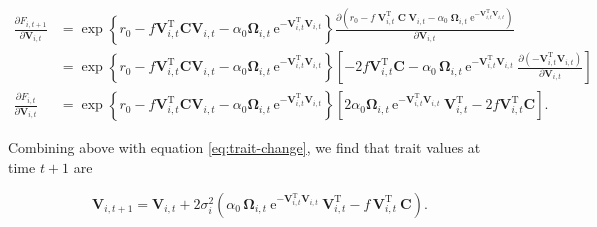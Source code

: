 \begin{equation*}
\begin{split}
    \frac{\partial F_{i,t+1}}{\partial \mathbf{V}_{i,t}} &=
        \exp \left\{
            r_0
            - f \mathbf{V}_{i,t}^{\textrm{T}} \mathbf{C} \mathbf{V}_{i,t}
            - \alpha_0  \mathbf{\Omega}_{i,t} \,
                \textrm{e}^{- \mathbf{V}_{i,t}^{\textrm{T}} \mathbf{V}_{i,t}}
        \right\}
        \frac{\partial \!
            \left(
                r_0
                - f \; \mathbf{V}_{i,t}^{\textrm{T}} \; \mathbf{C} \; \mathbf{V}_{i,t}
                - \alpha_0 \; \mathbf{\Omega}_{i,t} \;
                    \textrm{e}^{- \mathbf{V}_{i,t}^{\textrm{T}} \mathbf{V}_{i,t}}
            \right)
            }{ \partial \mathbf{V}_{i,t} } \\
     &=
        \exp \left\{
            r_0
            - f \mathbf{V}_{i,t}^{\textrm{T}} \mathbf{C} \mathbf{V}_{i,t}
            - \alpha_0  \mathbf{\Omega}_{i,t} \,
                \textrm{e}^{- \mathbf{V}_{i,t}^{\textrm{T}} \mathbf{V}_{i,t}}
        \right\}
        \left[
            - 2 f \mathbf{V}_{i,t}^{\textrm{T}} \mathbf{C}
            - \alpha_0 \, \mathbf{\Omega}_{i,t} \,
                \textrm{e}^{- \mathbf{V}_{i,t}^{\textrm{T}} \mathbf{V}_{i,t} } \:
                \frac{\partial \! \left( - \mathbf{V}_{i,t}^{\textrm{T}} \mathbf{V}_{i,t} \right)
                    }{ \partial \mathbf{V}_{i,t} }
        \right] \\[2ex]
    \frac{ \partial F_{i,t} }{ \partial \mathbf{V}_{i,t} } &=
        \exp \left\{
            r_0
            - f \mathbf{V}_{i,t}^{\textrm{T}} \mathbf{C} \mathbf{V}_{i,t}
            - \alpha_0  \mathbf{\Omega}_{i,t} \,
                \textrm{e}^{- \mathbf{V}_{i,t}^{\textrm{T}} \mathbf{V}_{i,t}}
        \right\}
        \left[
            2 \alpha_0 \mathbf{\Omega}_{i,t} \,
                \textrm{e}^{- \mathbf{V}_{i,t}^{\textrm{T}} \mathbf{V}_{i,t}} \:
                \mathbf{V}_{i,t}^{\textrm{T}}
            - 2 f \mathbf{V}_{i,t}^{\textrm{T}} \mathbf{C}
        \right]
    \textrm{.}
\end{split}
\end{equation*}



Combining above with equation \ref{eq:trait-change}, we find that trait values at
time $t+1$ are

\begin{equation} \label{eq:trait-change-full}
    \mathbf{V}_{i,t+1} = \mathbf{V}_{i,t} + 2 \sigma_i^2
    \left(
        \alpha_0 \, \mathbf{\Omega}_{i,t} \:
            \textrm{e}^{- \mathbf{V}_{i,t}^{\textrm{T}} \mathbf{V}_{i,t}} \:
            \mathbf{V}_{i,t}^{\textrm{T}}
        - f \, \mathbf{V}_{i,t}^{\textrm{T}} \: \mathbf{C}
    \right)
    \textrm{.}
\end{equation}


